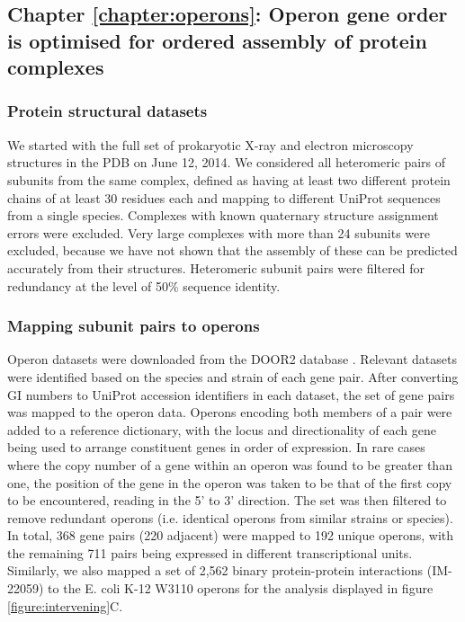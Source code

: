 \documentclass[a4paper,11pt,twoside,openright]{scrbook}
\begin{document}
\subsection{Chapter \ref*{chapter:operons}: Operon gene order is optimised for ordered assembly of protein complexes}

\subsubsection{Protein structural datasets}
We started with the full set of prokaryotic X-ray and electron microscopy structures in the PDB on June 12, 2014. We considered all heteromeric pairs of subunits from the same complex, defined as having at least two different protein chains of at least 30 residues each and mapping to different UniProt sequences from a single species. Complexes with known quaternary structure assignment errors \cite{Levy2007} were excluded. Very large complexes with more than 24 subunits were excluded, because we have not shown that the assembly of these can be predicted accurately from their structures. Heteromeric subunit pairs were filtered for redundancy at the level of 50\% sequence identity.

\subsubsection{Mapping subunit pairs to operons}
Operon datasets were downloaded from the DOOR2 database \cite{Mao2014}. Relevant datasets were identified based on the species and strain of each gene pair. After converting GI numbers to UniProt accession identifiers in each dataset, the set of gene pairs was mapped to the operon data. Operons encoding both members of a pair were added to a reference dictionary, with the locus and directionality of each gene being used to arrange constituent genes in order of expression. In rare cases where the copy number of a gene within an operon was found to be greater than one, the position of the gene in the operon was taken to be that of the first copy to be encountered, reading in the 5' to 3' direction. The set was then filtered to remove redundant operons (i.e. identical operons from similar strains or species). In total, 368 gene pairs (220 adjacent) were mapped to 192 unique operons, with the remaining 711 pairs being expressed in different transcriptional units. Similarly, we also mapped a set of 2,562 binary protein-protein interactions (IM-22059) \cite{Rajagopala2014} to the E. coli K-12 W3110 operons for the analysis displayed in figure \ref{figure:intervening}C.
\end{document}
